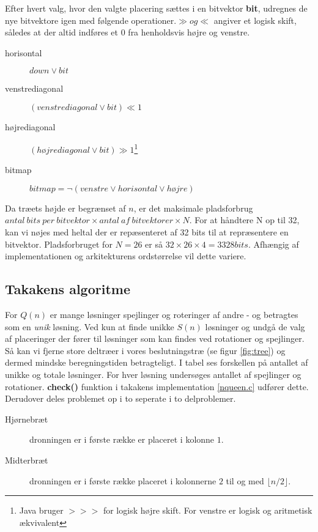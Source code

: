 \documentclass[pdf,draft,a4paper,11pt]{article}
\begin{document}
Efter hvert valg, hvor den valgte placering sættes i en bitvektor \textbf{bit}, udregnes de nye bitvektore igen med følgende operationer.$\gg og \ll$ angiver et logisk skift, således at der altid indføres et $0$ fra henholdsvis højre og venstre.
\begin{description}
	\item[horisontal] $down \lor bit$ 
	\item[venstrediagonal] $(venstrediagonal \lor bit) \ll 1$
	\item[højrediagonal] $(højrediagonal \lor bit) \gg  1$\footnote{Java bruger $>>>$ for logisk højre skift. For venstre er logisk og aritmetisk ækvivalent}
	\item[bitmap]	$bitmap = \lnot(venstre \lor horisontal \lor højre)$	
\end{description}

Da træets højde er begrænset af $n$, er det maksimale pladsforbrug $antal\ bits\ per\ bitvektor \times antal\ af\ bitvektorer \times N$. For at håndtere N op til 32, kan vi nøjes med heltal der er repæsenteret af 32 bits til at repræsentere en bitvektor. Pladsforbruget for $N=26$ er så $32\times 26 \times 4 = 3328 bits$. Afhængig af implementationen og arkitekturens ordstørrelse vil dette variere. 

\subsection{Takakens algoritme}\label{takalgo}

For $Q(n)$ er mange løsninger spejlinger og roteringer af andre - og betragtes som en \emph{unik} løsning. Ved kun at finde unikke $S(n)$ løsninger og undgå de valg af placeringer der fører til løsninger som kan findes ved rotationer og spejlinger. Så kan vi fjerne store deltræer i vores beslutningstræ (se figur \ref{fig:tree}) og dermed mindske beregningstiden betragteligt. I tabel  ses forskellen på antallet af unikke og totale løsninger. For hver løsning undersøges antallet af spejlinger og rotationer. \textbf{check()} funktion i takakens implementation \ref{nqueen.c} udfører dette. Derudover deles problemet op i to seperate i to delproblemer. 

\begin{description}
	\item[Hjørnebræt] dronningen er i første række er placeret i kolonne $1$.
	\item[Midterbræt] dronningen er i første række placeret i kolonnerne $2$  til og med $\lfloor n/2 \rfloor$.
\end{description}
\end{document}
